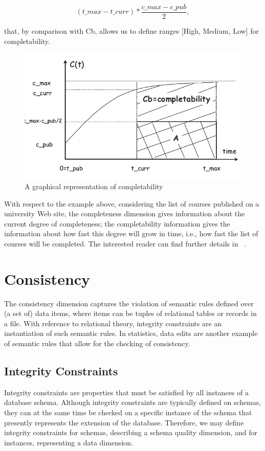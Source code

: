 \begin{equation*}
    ({t\_max}-{t\_curr}) * \frac{{c\_max - {c\_pub}}}{2},
\end{equation*}

that, by comparison with Cb, allows us to define ranges [High, Medium, Low]
for completability.

\begin{figure}[H]
    \vspace*{.0in}
    \centering
    \includegraphics[scale=.50]{completeness_of_web_data}
    \caption{A graphical representation of completability}    
\end{figure}

With respect to the example above, considering the list of courses published on a university Web site, the completeness dimension gives information
about the current degree of completeness; the completability information gives
the information about how fast this degree will grow in time, i.e., how fast
the list of courses will be completed. The interested reader can find further
details in ~\cite{pernicib.scannapiecom.2003}.

\section{Consistency}

The consistency dimension captures the violation of semantic rules defined
over (a set of) data items, where items can be tuples of relational tables or
records in a file. With reference to relational theory, integrity constraints are
an instantiation of such semantic rules. In statistics, data edits are another
example of semantic rules that allow for the checking of consistency.

\subsection{Integrity Constraints}
Integrity constraints are properties that must be satisfied by all instances
of a database schema. Although integrity constraints are typically defined on
schemas, they can at the same time be checked on a specific instance of the
schema that presently represents the extension of the database. Therefore,
we may define integrity constraints for schemas, describing a schema quality
dimension, and for instances, representing a data dimension.

